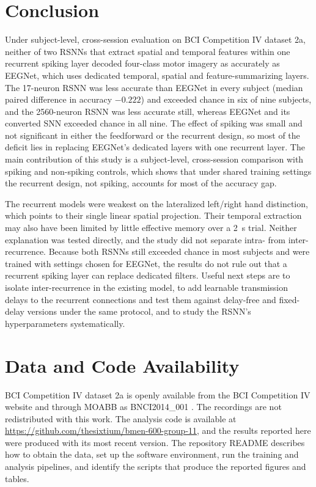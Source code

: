 \documentclass[conference]{IEEEtran}
\begin{document}
\section{Conclusion}
\label{sec:conclusion}

Under subject-level, cross-session evaluation on BCI Competition IV dataset 2a, neither of two RSNNs that extract spatial and temporal features within one recurrent spiking layer decoded four-class motor imagery as accurately as EEGNet, which uses dedicated temporal, spatial and feature-summarizing layers. The 17-neuron RSNN was less accurate than EEGNet in every subject (median paired difference in accuracy $-0.222$) and exceeded chance in six of nine subjects, and the 2560-neuron RSNN was less accurate still, whereas EEGNet and its converted SNN exceeded chance in all nine. The effect of spiking was small and not significant in either the feedforward or the recurrent design, so most of the deficit lies in replacing EEGNet's dedicated layers with one recurrent layer. The main contribution of this study is a subject-level, cross-session comparison with spiking and non-spiking controls, which shows that under shared training settings the recurrent design, not spiking, accounts for most of the accuracy gap.

The recurrent models were weakest on the lateralized left/right hand distinction, which points to their single linear spatial projection. Their temporal extraction may also have been limited by little effective memory over a 2~s trial. Neither explanation was tested directly, and the study did not separate intra- from inter-recurrence. Because both RSNNs still exceeded chance in most subjects and were trained with settings chosen for EEGNet, the results do not rule out that a recurrent spiking layer can replace dedicated filters. Useful next steps are to isolate inter-recurrence in the existing model, to add learnable transmission delays to the recurrent connections and test them against delay-free and fixed-delay versions under the same protocol, and to study the RSNN's hyperparameters systematically.

\section*{Data and Code Availability}

BCI Competition IV dataset 2a is openly available from the BCI Competition IV website \cite{brunner2008} and through MOABB as BNCI2014\_001 \cite{jayaram2018,moabbdoc2014001}. The recordings are not redistributed with this work. The analysis code is available at \url{https://github.com/thesixtium/bmen-600-group-11}, and the results reported here were produced with its most recent version. The repository README describes how to obtain the data, set up the software environment, run the training and analysis pipelines, and identify the scripts that produce the reported figures and tables.
\end{document}

